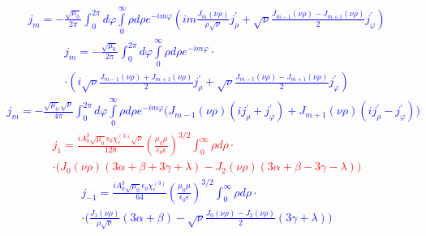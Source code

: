 \textcolor{blue} { \begin{equation*} \begin{aligned}
j_m = - \frac{\sqrt{\mu_0}}{2\pi} 
\int_0^{2\pi} d \varphi \int \limits_0^\infty \rho d \rho
e^{-im\varphi} \left( i m \frac{J_m (\nu \rho)}{\rho \sqrt{\nu}}
j_\rho^\prime + \sqrt{\nu}
\frac{J_{m-1} (\nu \rho) - J_{m+1} (\nu \rho)}{2}
j_\varphi^\prime \right)
\end{aligned} \end{equation*} }
%
\textcolor{blue} { \begin{equation*} \begin{aligned}
j_m = - \frac{\sqrt{\mu_0}}{2\pi} 
\int_0^{2\pi} d \varphi \int \limits_0^\infty \rho d \rho 
e^{-im\varphi} \cdot \\ \cdot 
\left( i \sqrt{\nu} \frac{J_{m-1} (\nu \rho) + J_{m+1} (\nu \rho)}{2}
j_\rho^\prime + \sqrt{\nu} 
\frac{J_{m-1} (\nu \rho) - J_{m+1} (\nu \rho)}{2}
j_\varphi^\prime \right)
\end{aligned} \end{equation*} }
%
\textcolor{blue} { \begin{equation*} \begin{aligned}
j_m = - \frac{\sqrt{\mu_0} \sqrt{\nu}}{4\pi} 
\int_0^{2\pi} d \varphi \int \limits_0^\infty \rho d \rho 
e^{-im\varphi} \Big(
J_{m-1} (\nu \rho) ( i j_\rho^\prime + j_\varphi^\prime ) +
J_{m+1} (\nu \rho) ( i j_\rho^\prime - j_\varphi^\prime ) \Big)
\end{aligned} \end{equation*} }
%
\textcolor{red} { \begin{equation} \begin{aligned}
j_1 = \frac{i A_0^3 \sqrt{\mu_0} \epsilon_0 \chi_e^{(3)} \sqrt{\nu}}{128}
\left( \frac{\mu_0 \mu}{\epsilon_0 \epsilon} \right)^{3/2}
\int_0^\infty \rho d \rho \cdot \\ \cdot
\Big( J_0 (\nu \rho) ( 3 \alpha + \beta + 3 \gamma + \lambda) - J_2 (\nu \rho)
( 3 \alpha + \beta - 3 \gamma - \lambda ) \Big)
\end{aligned} \end{equation} }
%
\textcolor{blue} { \begin{equation*} \begin{aligned}
j_{-1} = \frac{i A_0^3 \sqrt{\mu_0} \epsilon_0 \chi_e^{(3)}}{64}
\left( \frac{\mu_0 \mu}{\epsilon_0 \epsilon} \right)^{3/2}
\int_0^\infty \rho d \rho \cdot \\ \cdot
\Big( \frac{J_1 (\nu \rho)}{\rho \sqrt{\nu}}
( 3 \alpha + \beta ) - \sqrt{\nu}
\frac{J_0 (\nu \rho) - J_2 (\nu \rho)}{2}
( 3 \gamma + \lambda ) \Big)
\end{aligned} \end{equation*} }
